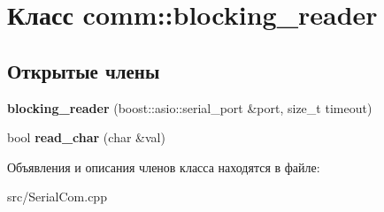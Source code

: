 \hypertarget{classcomm_1_1blocking__reader}{}\section{Класс comm\+:\+:blocking\+\_\+reader}
\label{classcomm_1_1blocking__reader}
\subsection*{Открытые члены}
\begin{DoxyCompactItemize}
\item 
\mbox{\label{classcomm_1_1blocking__reader_a7b62718b5d3ede657f53d8df63b6c820}} 
{\bfseries blocking\+\_\+reader} (boost\+::asio\+::serial\+\_\+port \&port, size\+\_\+t timeout)
\item 
\mbox{\label{classcomm_1_1blocking__reader_a43f770597c18ffcc3f23b09808c2e566}} 
bool {\bfseries read\+\_\+char} (char \&val)
\end{DoxyCompactItemize}


Объявления и описания членов класса находятся в файле\+:\begin{DoxyCompactItemize}
\item 
src/Serial\+Com.\+cpp\end{DoxyCompactItemize}
